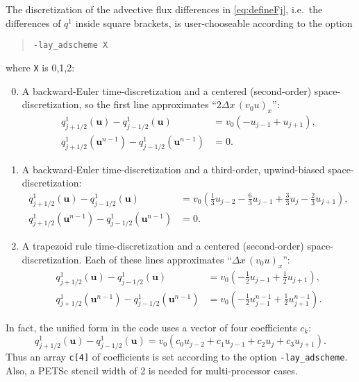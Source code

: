 \documentclass[11pt]{amsart}
\newcommand\bu{\mathbf{u}}
\begin{document}
The discretization of the advective flux differences in \eqref{eq:defineFj}, i.e.~the differences of $q^1$ inside square brackets, is user-chooseable according to the option
\begin{quote}
\verb|-lay_adscheme X|
\end{quote}
where \verb|X| is 0,1,2:
\medskip
\renewcommand{\labelenumi}{\texttt{X}$=$\arabic{enumi}: \quad}
\begin{enumerate}
\setcounter{enumi}{-1}
\item %
A backward-Euler time-discretization and a centered (second-order) space-discretization, so the first line approximates ``$2 \Delta x\,(v_0 u)_x$'':
\begin{align*}
q^1_{j+1/2}(\bu) - q^1_{j-1/2}(\bu)             &= v_0 \left( - u_{j-1} + u_{j+1} \right), \\
q^1_{j+1/2}(\bu^{n-1}) - q^1_{j-1/2}(\bu^{n-1}) &= 0.
\end{align*}
\item %
A backward-Euler time-discretization and a third-order, upwind-biased space-discretization:
\begin{align*}
q^1_{j+1/2}(\bu) - q^1_{j-1/2}(\bu)             &= v_0 \left( \tfrac{1}{3} u_{j-2} - \tfrac{6}{3} u_{j-1} + \tfrac{3}{3} u_j - \tfrac{2}{3} u_{j+1} \right), \\
q^1_{j+1/2}(\bu^{n-1}) - q^1_{j-1/2}(\bu^{n-1}) &= 0.
\end{align*}
\item %
A trapezoid rule time-discretization and a centered (second-order) space-discretization.  Each of these lines approximates ``$\Delta x\,(v_0 u)_x$'':
\begin{align*}
q^1_{j+1/2}(\bu) - q^1_{j-1/2}(\bu)             &= v_0 \left( - \tfrac{1}{2} u_{j-1} + \tfrac{1}{2} u_{j+1} \right), \\
q^1_{j+1/2}(\bu^{n-1}) - q^1_{j-1/2}(\bu^{n-1}) &= v_0 \left( - \tfrac{1}{2} u_{j-1}^{n-1} + \tfrac{1}{2} u_{j+1}^{n-1} \right).
\end{align*}
\end{enumerate}

\medskip
In fact, the unified form in the code uses a vector of four coefficients $c_k$:
\begin{equation}
   q^1_{j+1/2}(\bu) - q^1_{j-1/2}(\bu) = v_0 \left( c_0 u_{j-2} + c_1 u_{j-1} + c_2 u_j + c_3 u_{j+1} \right). \label{eq:dfluxunified}
\end{equation}
Thus an array \verb|c[4]| of coefficients is set according to the option \verb|-lay_adscheme|.  Also, a PETSc stencil width of 2 is needed for multi-processor cases.
\end{document}
